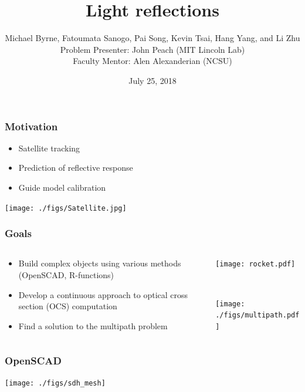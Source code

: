 \documentclass{beamer}
\title{Light reflections}
\date{July 25, 2018}
\author{
Michael Byrne, 
Fatoumata Sanogo,
Pai Song,
Kevin Tsai,
Hang Yang, and
Li Zhu\\
\medskip
Problem Presenter:  John Peach (MIT Lincoln Lab)\\
Faculty Mentor: Alen Alexanderian (NCSU)
}
\institute[Abbreviation]{SAMSI-IMSM}
\begin{document}
\begin{frame}
\titlepage
\end{frame}

\begin{frame}[t] 
\frametitle{Motivation} 
\begin{itemize} 
\item Satellite tracking 
\item Prediction of reflective response 
\item Guide model calibration 
\vspace{2mm}
\end{itemize} 
\centerline{\texttt{[image: ./figs/Satellite.jpg]}} 
\end{frame} 
 
\begin{frame} 
\frametitle{Goals} 

\begin{columns}
\begin{column}{0.5\textwidth}
\begin{itemize} 
\item Build complex objects using various methods (OpenSCAD, R-functions) 
\item Develop a continuous approach to optical cross section (OCS) computation 
\item Find a solution to the multipath problem 
\end{itemize} 
\end{column}
\begin{column}{0.5\textwidth}
\centerline{\texttt{[image: rocket.pdf]}}\\ 
\vspace{5mm}
\centerline{\texttt{[image: ./figs/multipath.pdf]}}
\end{column}
\end{columns}

\end{frame} 

\begin{frame}
\frametitle{OpenSCAD} 
\centerline{\texttt{[image: ./figs/sdh\_mesh]}} 
\end{frame}
\end{document}
